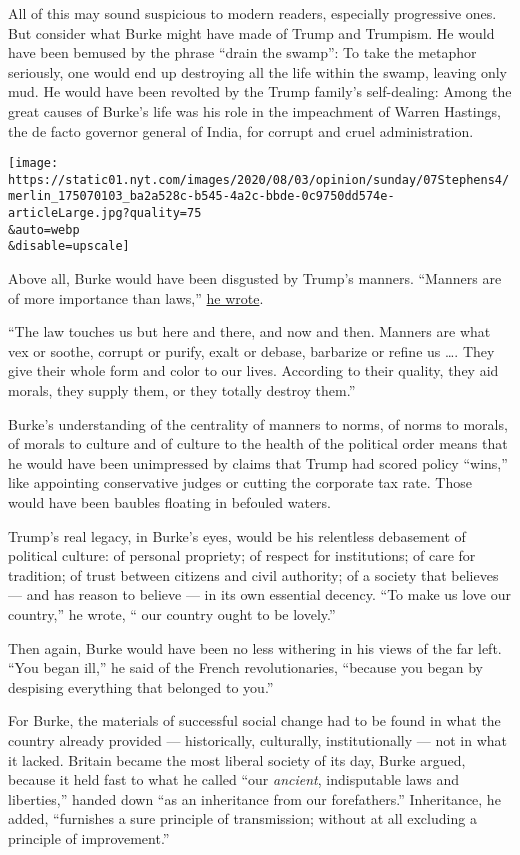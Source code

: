 All of this may sound suspicious to modern readers, especially
progressive ones. But consider what Burke might have made of Trump and
Trumpism. He would have been bemused by the phrase ``drain the swamp'':
To take the metaphor seriously, one would end up destroying all the life
within the swamp, leaving only mud. He would have been revolted by the
Trump family's self-dealing: Among the great causes of Burke's life was
his role in the impeachment of Warren Hastings, the de facto governor
general of India, for corrupt and cruel administration.

\texttt{[image: https://static01.nyt.com/images/2020/08/03/opinion/sunday/07Stephens4/merlin\_175070103\_ba2a528c-b545-4a2c-bbde-0c9750dd574e-articleLarge.jpg?quality=75\\\&auto=webp\\\&disable=upscale]}

Above all, Burke would have been disgusted by Trump's manners. ``Manners
are of more importance than laws,''
\href{https://quod.lib.umich.edu/e/ecco/004903102.0001.000/1:4?rgn=div1;view=fulltext}{he
wrote}.

``The law touches us but here and there, and now and then. Manners are
what vex or soothe, corrupt or purify, exalt or debase, barbarize or
refine us \ldots. They give their whole form and color to our lives.
According to their quality, they aid morals, they supply them, or they
totally destroy them.''

Burke's understanding of the centrality of manners to norms, of norms to
morals, of morals to culture and of culture to the health of the
political order means that he would have been unimpressed by claims that
Trump had scored policy ``wins,'' like appointing conservative judges or
cutting the corporate tax rate. Those would have been baubles floating
in befouled waters.

Trump's real legacy, in Burke's eyes, would be his relentless debasement
of political culture: of personal propriety; of respect for
institutions; of care for tradition; of trust between citizens and civil
authority; of a society that believes --- and has reason to believe ---
in its own essential decency. ``To make us love our country,'' he wrote,
`` our country ought to be lovely.''

Then again, Burke would have been no less withering in his views of the
far left. ``You began ill,'' he said of the French revolutionaries,
``because you began by despising everything that belonged to you.''

For Burke, the materials of successful social change had to be found in
what the country already provided --- historically, culturally,
institutionally --- not in what it lacked. Britain became the most
liberal society of its day, Burke argued, because it held fast to what
he called ``our \emph{ancient}, indisputable laws and liberties,''
handed down ``as an inheritance from our forefathers.'' Inheritance, he
added, ``furnishes a sure principle of transmission; without at all
excluding a principle of improvement.''

